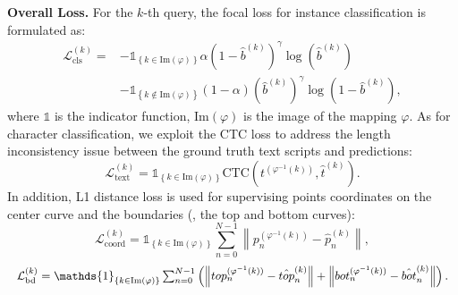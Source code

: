 \documentclass[10pt,twocolumn,letterpaper]{article}
\begin{document}
\noindent \textbf{Overall Loss.} For the $k$-th query, the focal loss for instance classification is formulated as:
\begin{equation}
\begin{aligned}
    \mathcal{L}_{\text{cls}}^{(k)} = & -\mathds{1}_{\left\{ k \in \text{Im}(\varphi) \right\}} \alpha (1-\hat{b}^{(k)})^\gamma \log (\hat{b}^{(k)}) \\
    & -\mathds{1}_{\left\{ k \notin \text{Im}(\varphi) \right\}} (1-\alpha) (\hat{b}^{(k)})^\gamma \log (1-\hat{b}^{(k)}),
\end{aligned}
\end{equation}
where $\mathds{1}$ is the indicator function, $\text{Im}(\varphi)$ is the image of the mapping $\varphi$. As for character classification, we exploit the CTC loss to address the length inconsistency issue between the ground truth text scripts and predictions:
\begin{equation}
    \mathcal{L}_{\text{text}}^{(k)} = \mathds{1}_{\left\{ k \in \text{Im}(\varphi) \right\}} \text{CTC}(t^{(\varphi^{-1}(k))}, \hat{t}^{(k)}).
\end{equation}
In addition, L1 distance loss is used for supervising points coordinates on the center curve and the boundaries (\ie, the top and bottom curves):
\begin{equation}
    \mathcal{L}_{\text{coord}}^{(k)} = \mathds{1}_{\left\{ k \in \text{Im}(\varphi) \right\}} \sum_{n=0}^{N-1} \left\|p_n^{(\varphi^{-1}(k))} - \hat{p}_n^{(k)} \right\|,
\end{equation}
\begin{equation}
\resizebox{1\linewidth}{!}{$
    \mathcal{L}_{\text{bd}}^{(k)} = \mathds{1}_{\left\{ k \in \text{Im}(\varphi) \right\}} \sum_{n=0}^{N-1} \left(\left\|top_n^{(\varphi^{-1}(k))} - \hat{top}_n^{(k)} \right\| + \left\|bot_n^{(\varphi^{-1}(k))} - \hat{bot}_n^{(k)} \right\|\right).
$}
\end{equation}
\end{document}
